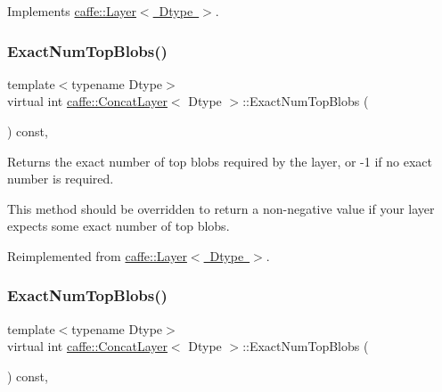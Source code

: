 Implements \mbox{\hyperlink{classcaffe_1_1_layer_a75c9b2a321dc713e0eaef530d02dc37f}{caffe\+::\+Layer$<$ Dtype $>$}}.

\mbox{\label{classcaffe_1_1_concat_layer_a0f19a4cac8676927f9c83010957a2921}} 
\subsubsection{\texorpdfstring{Exact\+Num\+Top\+Blobs()}{ExactNumTopBlobs()}\hspace{0.1cm}{\footnotesize\ttfamily [1/2]}}
{\footnotesize\ttfamily template$<$typename Dtype$>$ \\
virtual int \mbox{\hyperlink{classcaffe_1_1_concat_layer}{caffe\+::\+Concat\+Layer}}$<$ Dtype $>$\+::Exact\+Num\+Top\+Blobs (\begin{DoxyParamCaption}{ }\end{DoxyParamCaption}) const\hspace{0.3cm}{\ttfamily [inline]}, {\ttfamily [virtual]}}



Returns the exact number of top blobs required by the layer, or -\/1 if no exact number is required. 

This method should be overridden to return a non-\/negative value if your layer expects some exact number of top blobs. 

Reimplemented from \mbox{\hyperlink{classcaffe_1_1_layer_a64e2ca72c719e4b2f1f9216ccfb0d37f}{caffe\+::\+Layer$<$ Dtype $>$}}.

\mbox{\label{classcaffe_1_1_concat_layer_a0f19a4cac8676927f9c83010957a2921}} 
\subsubsection{\texorpdfstring{Exact\+Num\+Top\+Blobs()}{ExactNumTopBlobs()}\hspace{0.1cm}{\footnotesize\ttfamily [2/2]}}
{\footnotesize\ttfamily template$<$typename Dtype$>$ \\
virtual int \mbox{\hyperlink{classcaffe_1_1_concat_layer}{caffe\+::\+Concat\+Layer}}$<$ Dtype $>$\+::Exact\+Num\+Top\+Blobs (\begin{DoxyParamCaption}{ }\end{DoxyParamCaption}) const\hspace{0.3cm}{\ttfamily [inline]}, {\ttfamily [virtual]}}




